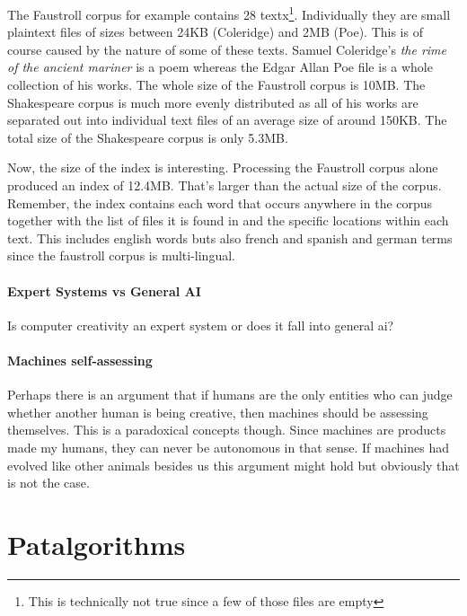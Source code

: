 The Faustroll corpus for example contains 28 textx\footnote{This is technically not true since a few of those files are empty}. Individually they are small plaintext files of sizes between 24KB (Coleridge) and 2MB (Poe). This is of course caused by the nature of some of these texts. Samuel Coleridge's \textit{the rime of the ancient mariner} is a poem whereas the Edgar Allan Poe file is a whole collection of his works. The whole size of the Faustroll corpus is 10MB. The Shakespeare corpus is much more evenly distributed as all of his works are separated out into individual text files of an average size of around 150KB. The total size of the Shakespeare corpus is only 5.3MB.

Now, the size of the index is interesting. Processing the Faustroll corpus alone produced an index of 12.4MB. That's larger than the actual size of the corpus. Remember, the index contains each word that occurs anywhere in the corpus together with the list of files it is found in and the specific locations within each text. This includes english words buts also french and spanish and german terms since the faustroll corpus is multi-lingual.





\paragraph{Expert Systems vs General AI}
Is computer creativity an expert system or does it fall into general \gls{ai}? 


\paragraph{Machines self-assessing}
Perhaps there is an argument that if humans are the only entities who can judge whether another human is being creative, then machines should be assessing themselves. This is a paradoxical concepts though. Since machines are products made my humans, they can never be autonomous in that sense. If machines had evolved like other animals besides us this argument might hold but obviously that is not the case.



\section{Patalgorithms}

